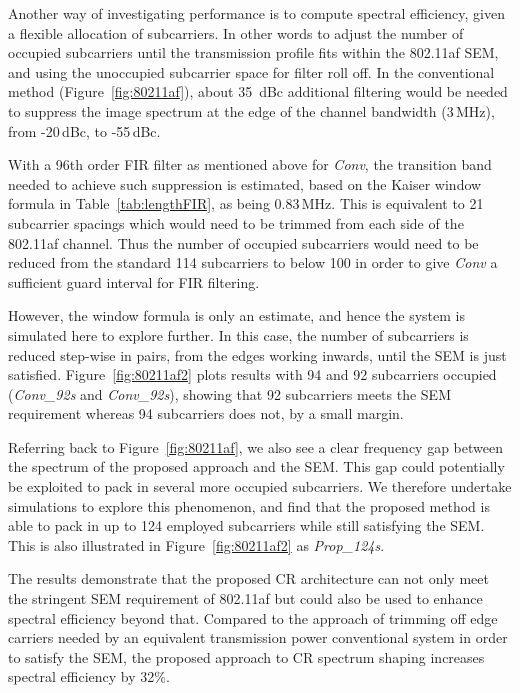 Another way of investigating performance is to compute spectral efficiency, given a flexible allocation of subcarriers.
In other words to adjust the number of occupied subcarriers until the transmission profile fits within the 802.11af SEM, and using the unoccupied subcarrier space for filter roll off.
In the conventional method (Figure~\ref{fig:80211af}), about 35~dBc additional filtering would be needed to suppress the image spectrum at the edge of the channel bandwidth (3\,MHz), from -20\,dBc, to -55\,dBc.

With a 96th order FIR filter as mentioned above for \emph{Conv}, the transition band needed to achieve such suppression is estimated, based on the Kaiser window formula in Table~\ref{tab:lengthFIR}, as being 0.83\,MHz.
This is equivalent to 21 subcarrier spacings which would need to be trimmed from each side of the 802.11af channel.
Thus the number of occupied subcarriers would need to be reduced from the standard 114 subcarriers to below 100 in order to give \emph{Conv} a sufficient guard interval for FIR filtering.

However, the window formula is only an estimate, and hence the system is simulated here to explore further.
In this case, the number of subcarriers is reduced step-wise in pairs, from the edges working inwards, until the SEM is just satisfied.
Figure~\ref{fig:80211af2} plots results with 94 and 92 subcarriers occupied (\emph{Conv\_92s} and \emph{Conv\_92s}), showing that 92 subcarriers meets the SEM requirement whereas 94 subcarriers does not, by a small margin.

Referring back to Figure~\ref{fig:80211af}, we also see a clear frequency gap between the spectrum of the proposed approach and the SEM.
This gap could potentially be exploited to pack in several more occupied subcarriers.
We therefore undertake simulations to explore this phenomenon, and find that the proposed method is able to pack in up to 124 employed subcarriers while still satisfying the SEM.
This is also illustrated in Figure~\ref{fig:80211af2} as \emph{Prop\_124s}.

The results demonstrate that the proposed CR architecture can not only meet the stringent SEM requirement of 802.11af but could also be used to enhance spectral efficiency beyond that.
Compared to the approach of trimming off edge carriers needed by an equivalent transmission power conventional system in order to satisfy the SEM, the proposed approach to CR spectrum shaping increases spectral efficiency by 32\%.

